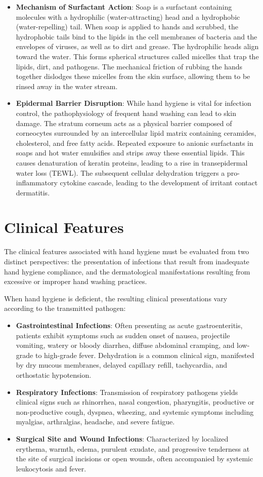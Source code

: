 \begin{itemize}
    \item \textbf{Mechanism of Surfactant Action}: Soap is a surfactant containing molecules with a hydrophilic (water-attracting) head and a hydrophobic (water-repelling) tail. When soap is applied to hands and scrubbed, the hydrophobic tails bind to the lipids in the cell membranes of bacteria and the envelopes of viruses, as well as to dirt and grease. The hydrophilic heads align toward the water. This forms spherical structures called micelles that trap the lipids, dirt, and pathogens. The mechanical friction of rubbing the hands together dislodges these micelles from the skin surface, allowing them to be rinsed away in the water stream.
    \item \textbf{Epidermal Barrier Disruption}: While hand hygiene is vital for infection control, the pathophysiology of frequent hand washing can lead to skin damage. The stratum corneum acts as a physical barrier composed of corneocytes surrounded by an intercellular lipid matrix containing ceramides, cholesterol, and free fatty acids. Repeated exposure to anionic surfactants in soaps and hot water emulsifies and strips away these essential lipids. This causes denaturation of keratin proteins, leading to a rise in transepidermal water loss (TEWL). The subsequent cellular dehydration triggers a pro-inflammatory cytokine cascade, leading to the development of irritant contact dermatitis.
\end{itemize}

\section*{Clinical Features}
The clinical features associated with hand hygiene must be evaluated from two distinct perspectives: the presentation of infections that result from inadequate hand hygiene compliance, and the dermatological manifestations resulting from excessive or improper hand washing practices.

When hand hygiene is deficient, the resulting clinical presentations vary according to the transmitted pathogen:
\begin{itemize}
    \item \textbf{Gastrointestinal Infections}: Often presenting as acute gastroenteritis, patients exhibit symptoms such as sudden onset of nausea, projectile vomiting, watery or bloody diarrhea, diffuse abdominal cramping, and low-grade to high-grade fever. Dehydration is a common clinical sign, manifested by dry mucous membranes, delayed capillary refill, tachycardia, and orthostatic hypotension.
    \item \textbf{Respiratory Infections}: Transmission of respiratory pathogens yields clinical signs such as rhinorrhea, nasal congestion, pharyngitis, productive or non-productive cough, dyspnea, wheezing, and systemic symptoms including myalgias, arthralgias, headache, and severe fatigue.
    \item \textbf{Surgical Site and Wound Infections}: Characterized by localized erythema, warmth, edema, purulent exudate, and progressive tenderness at the site of surgical incisions or open wounds, often accompanied by systemic leukocytosis and fever.
\end{itemize}

